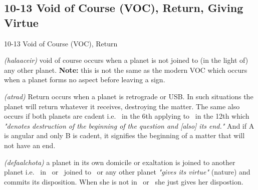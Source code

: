 \subsection{10-13 Void of Course (VOC), Return, Giving Virtue}
\begin{frame}[t]{10-13 Void of Course (VOC), Return}
\begin{description}[style=nextline]
\item[10. Void of Course] \textsl{(halaaceir)} void of course occurs when a planet is not joined to (in the light of) any other planet. \textbf{Note:} this is not the same as the modern VOC  which occurs when a planet forms no aspect before leaving a sign.

\item[11. Return] \textsl{(atrad)} Return occurs when a planet is retrograde or USB. In such situations the planet will return whatever it receives, destroying the matter. The same also occurs if both planets are cadent i.e. \Moon\ in the 6th applying to \Mars\ in the 12th which \textsl{"denotes destruction of the beginning of the question and [also] its end."} And if A is angular and only B is cadent, it signifies the beginning of a matter that will not have an end.

\item[12-13. Giving Virtue and Nature] \textsl{(defaalchota)} a planet in its own domicile or exaltation is joined to another planet i.e. \Moon\ in \Cancer\ or \Taurus\ joined to \Jupiter\ or any other planet \textsl{"gives its virtue"} (nature) and commits its disposition. When she is not in \Taurus\ or \Cancer\ she just gives her dispostion.\footnotemark[1]
\end{description}
\end{frame}




